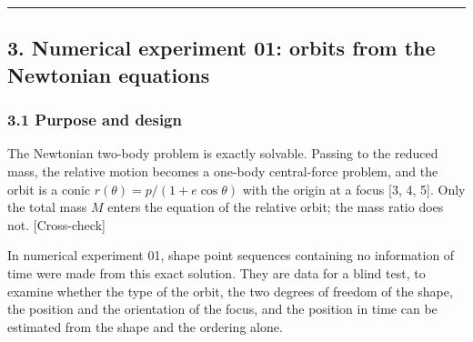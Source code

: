 \documentclass[
  a4paper,
]{article}
\begin{document}
\begin{center}\rule{0.5\linewidth}{0.5pt}\end{center}

\subsection{3. Numerical experiment 01: orbits from the Newtonian
equations}\label{numerical-experiment-01-orbits-from-the-newtonian-equations}

\subsubsection{3.1 Purpose and design}\label{purpose-and-design}

The Newtonian two-body problem is exactly solvable. Passing to the
reduced mass, the relative motion becomes a one-body central-force
problem, and the orbit is a conic \(r(\theta)=p/(1+e\cos\theta)\) with
the origin at a focus {[}3, 4, 5{]}. Only the total mass \(M\) enters
the equation of the relative orbit; the mass ratio does not.
{[}Cross-check{]}

In numerical experiment 01, shape point sequences containing no
information of time were made from this exact solution. They are data
for a blind test, to examine whether the type of the orbit, the two
degrees of freedom of the shape, the position and the orientation of the
focus, and the position in time can be estimated from the shape and the
ordering alone.
\end{document}
